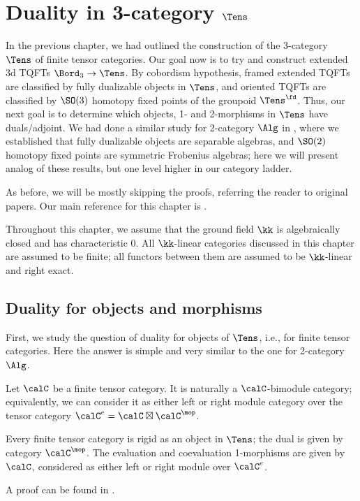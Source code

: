 \chapter{Duality in 3-category $\Tens$}\label{c:tens-dual}

In the previous chapter, we had outlined the construction of the 3-category
$\Tens$ of finite tensor categories. Our goal now is to try and construct
extended 3d TQFTs $\Bord_3\to \Tens$. By cobordism hypothesis, framed extended
TQFTs are classified by fully dualizable objects in $\Tens$, and oriented TQFTs
are classified by $\SO(3)$ homotopy fixed points of the groupoid $\Tens^\fd$.
Thus, our next goal is to determine which objects, 1- and 2-morphisms in
$\Tens$ have duals/adjoint. We had done a similar study for 2-category $\Alg$ in
, where we established that fully dualizable
objects are separable algebras, and $\SO(2)$ homotopy fixed points are symmetric
Frobenius algebras; here we will present analog of these results, but one level
higher in our category ladder.

As before, we will be mostly skipping the proofs, referring the reader to
original papers. Our main reference for this chapter is \cite{dsps-dualizable}.

Throughout this chapter, we assume that the ground field $\kk$ is algebraically
closed and has characteristic 0. All $\kk$-linear categories discussed in this
chapter are assumed to be finite; all functors between them are assumed to be
$\kk$-linear and right exact.

\section{Duality for objects and morphisms}\label{s:duality-obj-mor}

First, we study the question of duality for objects of $\Tens$, i.e., for finite
tensor categories. Here the answer is simple and very similar to the one for
2-category $\Alg$.

Let $\calC$ be a finite tensor category. It is naturally a $\calC$-bimodule
category; equivalently, we can consider it as either left or right module
category over the tensor category $\calC^e=\calC\boxtimes\calC^\mop$.

\begin{theorem}\label{t:tens-rigid}
  Every finite tensor category is rigid as an object in $\Tens$; the dual is
  given by category $\calC^\mop$. The evaluation and coevaluation 1-morphisms
  are given by $\calC$, considered as either left or right module over
  $\calC^e$.
\end{theorem}
A proof can be found in \cite[Proposition 3.1.2]{dsps-dualizable}.

